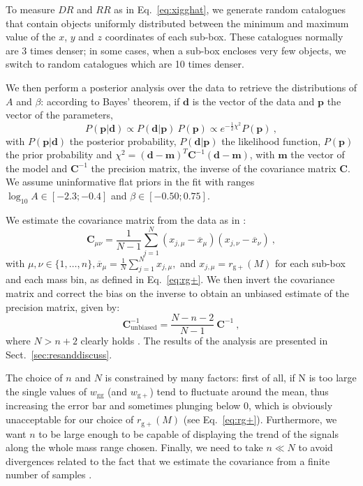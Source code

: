 \documentclass[a4paper,fleqn,usenatbib]{mnras}
\begin{document}
To measure $DR$ and $RR$ as in Eq.~\ref{eq:xigghat}, we generate random catalogues that contain objects uniformly distributed between the minimum and maximum value of the $x$, $y$ and $z$ coordinates of each sub-box. These catalogues normally are 3 times denser; in some cases, when a sub-box encloses very few objects, we switch to random catalogues which are 10 times denser.

We then perform a posterior analysis over the data to retrieve the distributions of $A$ and $\beta$: according to Bayes' theorem, if $\boldsymbol{d}$ is the vector of the data and $\boldsymbol{p}$ the vector of the parameters, 
\begin{equation}
    P(\boldsymbol{p} | \boldsymbol{d}) \propto P(\boldsymbol{d} | \boldsymbol{p}) \ P(\boldsymbol{p}) \propto e^{-\frac{1}{2} \chi ^2} P(\boldsymbol{p}) \ ,
	\label{eq:bayes}
\end{equation}
with $P(\boldsymbol{p} | \boldsymbol{d})$ the posterior probability, $P(\boldsymbol{d} | \boldsymbol{p})$ the likelihood function, $P(\boldsymbol{p})$ the prior probability and $\chi ^2 = (\boldsymbol{d} - \boldsymbol{m})^T \mathbf{C}^{-1} (\boldsymbol{d} - \boldsymbol{m})$, with $\boldsymbol{m}$ the vector of the model and $\mathbf{C}^{-1}$ the precision matrix, the inverse of the covariance matrix $\mathbf{C}$. We assume uninformative flat priors in the fit with ranges $\log_{10} A \in [-2.3;-0.4]$ and $\beta \in [-0.50;0.75]$. 

We estimate the covariance matrix from the data as in \citet{Tayloretal2013}:
\begin{equation}
     \mathbf{C}_{\mu \nu} = \frac{1}{N-1} \sum_{j = 1}^{N} (x_{j, \mu} - \overline{x}_{\mu})(x_{j, \nu} - \overline{x}_{\nu}) \ ,
	\label{eq:covariance}
\end{equation}
with $\mu, \nu \in \{1, \dotso, n\}, \overline{x}_{\mu} = \frac{1}{N} \sum_{j=1}^{N} x_{j, \mu},$ and $x_{j, \mu}= r_{\mathrm{g+}}(M)$ for each sub-box and each mass bin, as defined in Eq.~\ref{eq:rg+}. We then invert the covariance matrix and correct the bias on the inverse to obtain an unbiased estimate of the precision matrix, given by:
\begin{equation}
     \mathbf{C}^{-1}_{\mathrm{unbiased}} = \frac{N - n -2}{N-1} \  \mathbf{C}^{-1} \ ,
	\label{eq:precunbiased}
\end{equation}
where $N > n+2$ clearly holds \citep{Tayloretal2013}. The results of the analysis are presented in Sect.~\ref{sec:resanddiscuss}.

The choice of $n$ and $N$ is constrained by many factors: first of all, if N is too large the single values of $w_{\mathrm{gg}}$ (and $w_{\mathrm{g+}}$) tend to fluctuate around the mean, thus increasing the error bar and sometimes plunging below 0, which is obviously unacceptable for our choice of $ r_{\mathrm{g+}} (M)$ (see Eq.~\ref{eq:rg+}). Furthermore, we want $n$ to be large enough to be capable of displaying the trend of the signals along the whole mass range chosen. Finally, we need to take $n \ll N$ to avoid divergences related to the fact that we estimate the covariance from a finite number of samples \citep{Tayloretal2013}.
\end{document}
